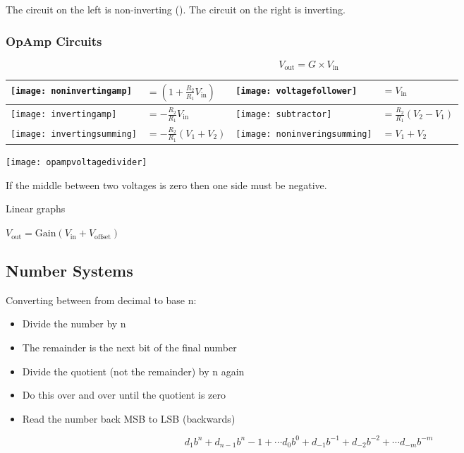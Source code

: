 \documentclass[12pt]{article}
\begin{document}
The circuit on the left is non-inverting ().
The circuit on the right is inverting. 
\subsubsection{OpAmp Circuits}
\begin{equation*}
  V_{\text{out}} = G \times V_{\text{in}}
\end{equation*}

\begin{table}[ht]
  \begin{tabular}{|m{4cm}|m{3cm}|m{4cm}|m{3cm}|}
    \hline
    \texttt{[image: noninvertingamp]} &
    $= ( 1 + \frac{R_2}{R_1}V_{\text{in}})$ &
    \texttt{[image: voltagefollower]} &
    $= V_{\text{in}}$ \\
    \hline
    \texttt{[image: invertingamp]} &
    $= -\frac{R_2}{R_1}V_{\text{in}}$ &
    \texttt{[image: subtractor]} &
    $= \frac{R_2}{R_1}(V_2 - V_1)$ \\
    \hline
    \texttt{[image: invertingsumming]} &
    $= -\frac{R_2}{R_1}(V_1+V_2)$ &
    \texttt{[image: noninveringsumming]} &
    $= V_1 + V_2$ \\
    \hline
  \end{tabular}
\end{table}

\texttt{[image: opampvoltagedivider]}

If the middle between two voltages is zero then one side must be negative. 

\begin{example*}
Linear graphs

$V_{\text{out}} = \text{Gain}(V_\text{in} + V_\text{offset})$
\end{example*}

\subsection{Number Systems}
Converting between from decimal to base n:
\begin{itemize}
  \item Divide the number by n
  \item The remainder is the next bit of the final number
  \item Divide the quotient (not the remainder) by n again
  \item Do this over and over until the quotient is zero
  \item Read the number back MSB to LSB (backwards)
\end{itemize}
\begin{equation*}
  d_1b^n+d_{n-1}b^n-1 + \cdots d_0b^0 + d_{-1}b^{-1} + d_{-2}b^{-2} + \cdots d_{-m}b^{-m}
\end{equation*}
\end{document}
